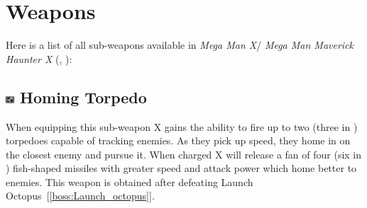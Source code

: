 \section{Weapons}\label{X1:sub_weapon}
Here is a list of all sub-weapons available in\textit{ Mega Man X}/ \textit{Mega Man Maverick Haunter X} (\cite{MHX:manual}, \cite{wiki:X_weapons}):

\subsection{\includegraphics[width=12px, height=10px]{figures/X1/weapons/Homig_T.jpg} Homing Torpedo}\label{Homing_torpedo}
When equipping this sub-weapon X gains the ability to fire up to two (three in \mhx)~\cite{wiki:Homing_torpedo} torpedoes capable of tracking enemies. As they pick up speed, they home in on the closest enemy and pursue it. When charged X will release a fan of four (six in \mhx) fish-shaped missiles with greater speed and attack power which home better to enemies. This weapon is obtained after defeating Launch Octopus~[\ref{boss:Launch_octopus}].

